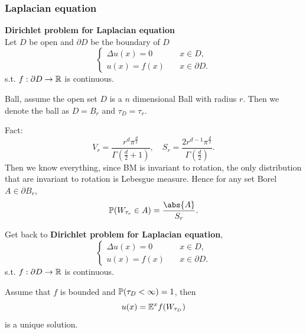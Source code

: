 \subsubsection{Laplacian equation}
\begin{dfn}{\textbf{Dirichlet problem for Laplacian equation }}\label{DPL}
\\ Let $D$ be open and $\partial D$ be the boundary of $D$
\begin{equation*}
    \begin{cases}
        \Delta u(x) = 0 \quad &x\in D,\\
        u(x) = f(x) \quad &x\in \partial D.
    \end{cases}
\end{equation*}
s.t. $f: \partial D \rightarrow \mathbb{R}$ is continuous.  
\end{dfn}


\begin{example}
Ball, assume the open set $D$ is a $n$ dimensional Ball with radius $r$. Then we denote the ball as $D = B_r$ and $\tau_D = \tau_r$. 

Fact:
\begin{equation*}
    V_r = \frac{r^d \pi^{\frac{d}{2}}}{\Gamma(\frac{d}{2}+1)}, \quad S_r = \frac{2 r^{d-1}\pi^{\frac{d}{2}}}{\Gamma(\frac{d}{2})}.
\end{equation*}
Then we know everything, since BM is invariant to rotation, the only distribution that are invariant to rotation is Lebesgue measure. Hence
for any set Borel $A\in \partial B_r$,
\begin{equation*}
    \prob(W_{\tau_r}\in A) = \frac{\abs{A}}{S_r}.
\end{equation*}
\end{example}

Get back to \textbf{Dirichlet problem for Laplacian equation},
\begin{equation*}
    \begin{cases}
        \Delta u(x) = 0 \quad &x\in D,\\
        u(x) = f(x) \quad &x\in \partial D.
    \end{cases}
\end{equation*}
s.t. $f: \partial D \rightarrow \mathbb{R}$ is continuous.

\begin{thm}
Assume that $f$ is bounded and $\mathbb{P}(\tau_D < \infty) = 1$, then 
\begin{equation*}
    u(x) = \mathbb{E}^x f(W_{\tau_D})
\end{equation*}
is a unique  solution.
\end{thm}

